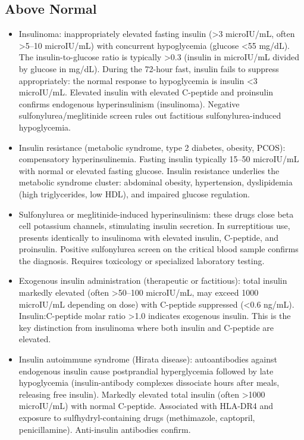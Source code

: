 \subsection*{Above Normal}
\begin{itemize}
  \item Insulinoma: inappropriately elevated fasting insulin (>3 microIU/mL, often >5--10 microIU/mL) with concurrent hypoglycemia (glucose <55 mg/dL). The insulin-to-glucose ratio is typically >0.3 (insulin in microIU/mL divided by glucose in mg/dL). During the 72-hour fast, insulin fails to suppress appropriately: the normal response to hypoglycemia is insulin <3 microIU/mL. Elevated insulin with elevated C-peptide and proinsulin confirms endogenous hyperinsulinism (insulinoma). Negative sulfonylurea/meglitinide screen rules out factitious sulfonylurea-induced hypoglycemia.
  \item Insulin resistance (metabolic syndrome, type 2 diabetes, obesity, PCOS): compensatory hyperinsulinemia. Fasting insulin typically 15--50 microIU/mL with normal or elevated fasting glucose. Insulin resistance underlies the metabolic syndrome cluster: abdominal obesity, hypertension, dyslipidemia (high triglycerides, low HDL), and impaired glucose regulation.
  \item Sulfonylurea or meglitinide-induced hyperinsulinism: these drugs close beta cell potassium channels, stimulating insulin secretion. In surreptitious use, presents identically to insulinoma with elevated insulin, C-peptide, and proinsulin. Positive sulfonylurea screen on the critical blood sample confirms the diagnosis. Requires toxicology or specialized laboratory testing.
  \item Exogenous insulin administration (therapeutic or factitious): total insulin markedly elevated (often >50--100 microIU/mL, may exceed 1000 microIU/mL depending on dose) with C-peptide suppressed (<0.6 ng/mL). Insulin:C-peptide molar ratio >1.0 indicates exogenous insulin. This is the key distinction from insulinoma where both insulin and C-peptide are elevated.
  \item Insulin autoimmune syndrome (Hirata disease): autoantibodies against endogenous insulin cause postprandial hyperglycemia followed by late hypoglycemia (insulin-antibody complexes dissociate hours after meals, releasing free insulin). Markedly elevated total insulin (often >1000 microIU/mL) with normal C-peptide. Associated with HLA-DR4 and exposure to sulfhydryl-containing drugs (methimazole, captopril, penicillamine). Anti-insulin antibodies confirm.

\end{itemize}
